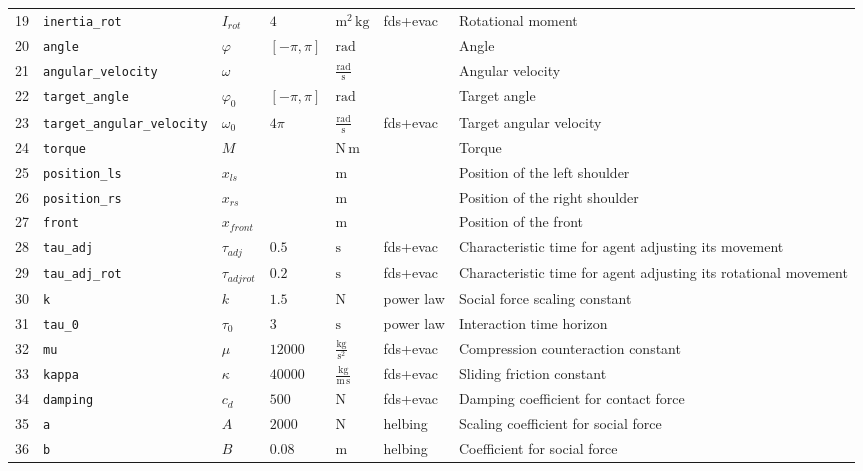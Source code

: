 \begin{tabular}{lllllll}
19 &  \verb|inertia_rot| &  $I_{rot}$ &  $4$ &  $\mathrm{m^{2}\,kg}$ &  fds+evac &  Rotational moment \\
20 &  \verb|angle| &  $\varphi$ &  $\left[- \pi, \pi\right]$ &  $\mathrm{rad}$ &   &  Angle \\
21 &  \verb|angular_velocity| &  $\omega$ &   &  $\mathrm{\frac{rad}{s}}$ &   &  Angular velocity \\
22 &  \verb|target_angle| &  $\varphi_{0}$ &  $\left[- \pi, \pi\right]$ &  $\mathrm{rad}$ &   &  Target angle \\
23 &  \verb|target_angular_velocity| &  $\omega_{0}$ &  $4 \pi$ &  $\mathrm{\frac{rad}{s}}$ &  fds+evac &  Target angular velocity \\
24 &  \verb|torque| &  $M$ &   &  $\mathrm{N\,m}$ &   &  Torque \\
25 &  \verb|position_ls| &  $x_{ls}$ &   &  $\mathrm{m}$ &   &  Position of the left shoulder \\
26 &  \verb|position_rs| &  $x_{rs}$ &   &  $\mathrm{m}$ &   &  Position of the right shoulder \\
27 &  \verb|front| &  $x_{front}$ &   &  $\mathrm{m}$ &   &  Position of the front \\
28 &  \verb|tau_adj| &  $\tau_{adj}$ &  $0.5$ &  $\mathrm{s}$ &  fds+evac &  Characteristic time for agent adjusting its  movement \\
29 &  \verb|tau_adj_rot| &  $\tau_{adjrot}$ &  $0.2$ &  $\mathrm{s}$ &  fds+evac &  Characteristic time for agent adjusting its  rotational movement \\
30 &  \verb|k| &  $k$ &  $1.5$ &  $\mathrm{N}$ &  power law &  Social force scaling constant \\
31 &  \verb|tau_0| &  $\tau_{0}$ &  $3$ &  $\mathrm{s}$ &  power law &  Interaction time horizon \\
32 &  \verb|mu| &  $\mu$ &  $12000$ &  $\mathrm{\frac{kg}{s^{2}}}$ &  fds+evac &  Compression counteraction constant \\
33 &  \verb|kappa| &  $\kappa$ &  $40000$ &  $\mathrm{\frac{kg}{m\,s}}$ &  fds+evac &  Sliding friction constant \\
34 &  \verb|damping| &  $c_{d}$ &  $500$ &  $\mathrm{N}$ &  fds+evac &  Damping coefficient for contact force \\
35 &  \verb|a| &  $A$ &  $2000$ &  $\mathrm{N}$ &  helbing &  Scaling coefficient for social force \\
36 &  \verb|b| &  $B$ &  $0.08$ &  $\mathrm{m}$ &  helbing &  Coefficient for social force \\

\end{tabular}

